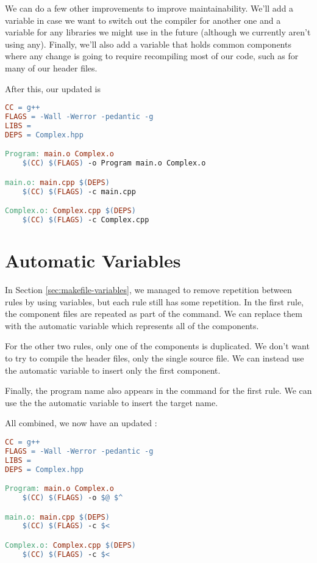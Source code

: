 We can do a few other improvements to improve maintainability.
We'll add a  variable in case we want to switch out the compiler for another one and a  variable for any libraries we might use in the future (although we currently aren't using any).
Finally, we'll also add a  variable that holds common components where any change is going to require recompiling most of our code, such as for many of our header files.

After this, our updated  is
\begin{lstlisting}[language=make]
CC = g++
FLAGS = -Wall -Werror -pedantic -g
LIBS = 
DEPS = Complex.hpp

Program: main.o Complex.o
	$(CC) $(FLAGS) -o Program main.o Complex.o

main.o: main.cpp $(DEPS)
	$(CC) $(FLAGS) -c main.cpp

Complex.o: Complex.cpp $(DEPS)
	$(CC) $(FLAGS) -c Complex.cpp
\end{lstlisting}


\section{Automatic Variables}\label{sec:makefile-special}

In Section \ref{sec:makefile-variables}, we managed to remove repetition between rules by using variables, but each rule still has some repetition.
In the first rule, the component files are repeated as part of the command.
We can replace them with the automatic variable \code{\$\^} which represents all of the components.

For the other two rules, only one of the components is duplicated.
We don't want to try to compile the header files, only the single source file.
We can instead use the automatic variable \code{\$<} to insert only the first component.

Finally, the program name also appears in the command for the first rule.
We can use the the automatic variable  to insert the target name.

All combined, we now have an updated :
\begin{lstlisting}[language=make]
CC = g++
FLAGS = -Wall -Werror -pedantic -g
LIBS = 
DEPS = Complex.hpp

Program: main.o Complex.o
	$(CC) $(FLAGS) -o $@ $^

main.o: main.cpp $(DEPS)
	$(CC) $(FLAGS) -c $<

Complex.o: Complex.cpp $(DEPS)
	$(CC) $(FLAGS) -c $<
\end{lstlisting}

